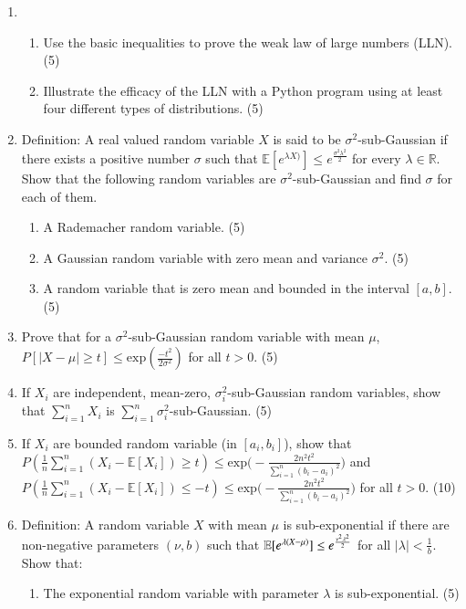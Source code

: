 \documentclass[journal,12pt,twocolumn]{IEEEtran}
\begin{document}
\begin{enumerate}
{\begin{enumerate}
\end{enumerate}}
\item{\begin{enumerate}
\item{
Use the basic inequalities to prove the weak law of large numbers (LLN). (5)}
\item{Illustrate the efficacy of the LLN with a Python program using at least four different types of distributions. (5)} 
\end{enumerate}
}
\item{Definition: A real valued random variable $X$ is said to be $\sigma^2$-sub-Gaussian if there exists a positive number $\sigma$ such that $\mathbb{E}[e^{\lambda X)}]\leq e^{\frac{\sigma^2\lambda^2}{2}}$ for every $\lambda \in \mathbb{R}$. Show that the following random variables are $\sigma^2$-sub-Gaussian and find $\sigma$ for each of them.
\begin{enumerate}
\item{A Rademacher random variable. (5)}
\item{A Gaussian random variable with zero mean and variance $\sigma^2$. (5)}
\item{A random variable that is zero mean and bounded in the interval $[a, b]$. (5)}
\end{enumerate}
}
\item{Prove that for a $\sigma^2$-sub-Gaussian random variable with mean $\mu$, $P[|X - \mu| \geq t] \leq \text{exp}(\frac{-t^2}{2\sigma^2})$ for all $t > 0$. (5)}
\item{If $X_i$ are independent, mean-zero, $\sigma_i^2$-sub-Gaussian random variables, show that $\sum\limits_{i=1}^n X_i$ is $\sum\limits_{i=1}^n \sigma_i^2$-sub-Gaussian. (5)}
\item{If $X_i$ are bounded random variable (in $[a_i, b_i]$), show that  $P(\frac{1}{n}\sum\limits_{i=1}^n (X_i - \mathbb{E}[{X_i}]) \geq t) \leq \text{exp}\Big(-\frac{2n^2t^2}{\sum\limits_{i=1}^n (b_i - a_i)^2}\Big)$ and $P(\frac{1}{n}\sum\limits_{i=1}^n (X_i - \mathbb{E}[{X_i}]) \leq -t) \leq \text{exp}\Big(-\frac{2n^2t^2}{\sum\limits_{i=1}^n (b_i - a_i)^2}\Big)$  for all $t > 0$. (10)}
\item{Definition: A random variable $X$ with mean $\mu$ is sub-exponential if there are non-negative parameters $(\nu, b)$ such that $\mathbb{E}[e^{\lambda(X - \mu)}] \leq e^{\frac{\nu^2\\\lambda^2}{2}}$ for all $|\lambda| < \frac{1}{b}$. Show that:
\begin{enumerate}
\item{The exponential random variable with parameter $\lambda$ is sub-exponential. (5)}

\end{enumerate}}
\end{enumerate}
\end{document}
